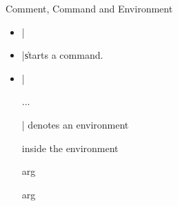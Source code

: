 \documentclass[xcolor={dvipsnames},aspectratio=169,10pt]{beamer}
\begin{document}
\begin{frame}[fragile]{Comment, Command and Environment}
  \begin{itemize}
    \item \latexinline|%
    \item \latexinline|\| starts a command.
          \begin{latexcode}
            \command %
            \command{} %
          \end{latexcode}
    \item \latexinline|\begin{} ... \end{}| denotes an environment
          \begin{latexcode}
            \begin{envname}
              inside the environment
            \end{envname}
            \begin{envname}{arg} \end{envname}
            \begin{envname}{arg} \end{envname}
          \end{latexcode}
  \end{itemize}
\end{frame}
\end{document}
